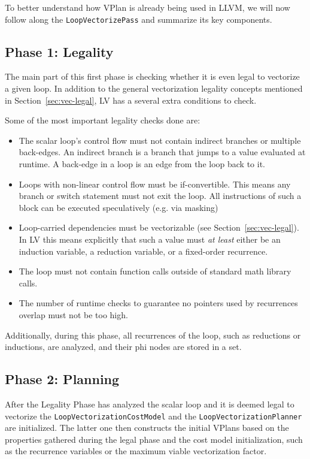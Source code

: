 \documentclass[sigplan,11pt,nonacm]{acmart}
\begin{document}
To better understand how VPlan is already being used in LLVM, we will now follow along the 
\texttt{LoopVectorizePass} and summarize its key components.

\subsection{Phase 1: Legality}
The main part of this first phase is checking whether it is even legal to vectorize a given loop. 
In addition to the general vectorization legality concepts mentioned in 
Section~\ref{sec:vec-legal}, LV has a several extra conditions to check.

Some of the most important legality checks done are:
\begin{itemize}
  \item The scalar loop's control flow must not contain indirect branches or multiple back-edges.
  An indirect branch is a branch that jumps to a value evaluated at runtime. A back-edge in a loop 
  is an edge from the loop back to it. 
  \item Loops with non-linear control flow must be if-convertible. This means any branch or switch 
  statement must not exit the loop. All instructions of such a block can be executed speculatively 
  (e.g. via masking)
  \item Loop-carried dependencies must be vectorizable (see Section~\ref{sec:vec-legal}). In LV 
  this means explicitly that such a value must \textit{at least} either be an induction variable, a reduction 
  variable, or a fixed-order recurrence.
  \item The loop must not contain function calls outside of standard math library calls.
  \item The number of runtime checks to guarantee no pointers used by recurrences overlap must not be too high.
\end{itemize}

Additionally, during this phase, all recurrences of the loop, such as reductions or inductions, are analyzed,
and their phi nodes are stored in a set.

\subsection{Phase 2: Planning}
After the Legality Phase has analyzed the scalar loop and it is deemed legal to vectorize the 
\texttt{LoopVectorizationCostModel} and the \texttt{LoopVectorizationPlanner} are initialized.
The latter one then constructs the initial VPlans based on the properties gathered during the legal phase
and the cost model initialization, such as the recurrence variables or the maximum viable vectorization 
factor.
\end{document}
